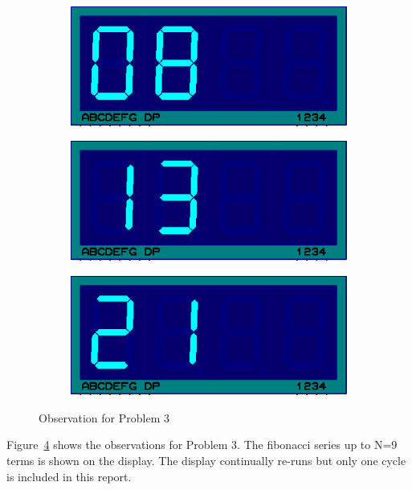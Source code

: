 \documentclass{lab_sheet}
\begin{document}
\begin{figure}[H]
        \begin{subfigure}{.33\textwidth}
            \centering
            \includegraphics[frame,width=.9\linewidth]{../Figures/f8}   
            \caption{}
            \label{fig:prob3-g}
          \end{subfigure}
          \begin{subfigure}{.33\textwidth}
            \centering
            \includegraphics[frame,width=.9\linewidth]{../Figures/f13}   
            \caption{}
            \label{fig:prob3-h}
          \end{subfigure}
          \begin{subfigure}{.33\textwidth}
            \centering
            \includegraphics[frame,width=.9\linewidth]{../Figures/f21}   
            \caption{}
            \label{fig:prob3-i}
          \end{subfigure}
        \caption{Observation for Problem 3}
        \label{fig:prob3}
        \end{figure}
        Figure~\ref{fig:prob3} shows the observations for Problem 3. The fibonacci series up to N=9 terms is shown on the display. The display continually re-runs but only one cycle is included in this report.
\end{document}
